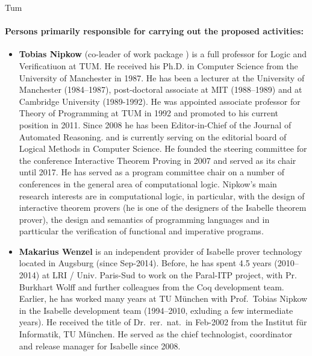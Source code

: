 \begin{sitedescription}{Tum}
\paragraph{Persons primarily responsible for carrying out the proposed activities:}

\begin{itemize}
\item \textbf{Tobias Nipkow} (co-leader of work package
  ) is a full professor for Logic and
  Verificatiuon at TUM. He received his Ph.D. in Computer Science
  from the University of Manchester in 1987.  He has been a
  lecturer at the University of Manchester (1984--1987),
  post-doctoral associate at MIT (1988--1989) and at Cambridge
  University (1989-1992). He was appointed associate professor for Theory of Programming at
  TUM in 1992 and promoted to his current position in 2011. Since 2008
  he has been Editor-in-Chief of the  Journal of Automated Reasoning.
 and is currently serving on the editorial board of Logical Methods in
 Computer Science. He founded the steering committee for the
 conference Interactive Theorem Proving in 2007 and served as its
 chair until 2017.
 He has served as a program committee chair
on a number of conferences in the general area of computational logic.  Nipkow's main research
interests are in computational logic, in particular, with the design of
interactive theorem provers (he is one of the designers of the
Isabelle theorem prover), the design and semantics of programming
languages and in partticular the verification of functional and
imperative programs.

\item \textbf{Makarius Wenzel} is an independent provider of Isabelle
  prover technology located in Augsburg (since Sep-2014). Before, he
  has spent 4.5 years (2010--2014) at LRI / Univ. Paris-Sud to work on
  the Paral-ITP project, with Pr. Burkhart Wolff and further
  colleagues from the Coq development team. Earlier, he has worked
  many years at TU München with Prof.\ Tobias Nipkow in the Isabelle
  development team (1994--2010, exluding a few intermediate years). He
  received the title of Dr.~rer.~nat.\ in Feb-2002 from the Institut
  für Informatik, TU München. He served as the chief technologist,
  coordinator and release manager for Isabelle since 2008.

\end{itemize}

\end{sitedescription}

